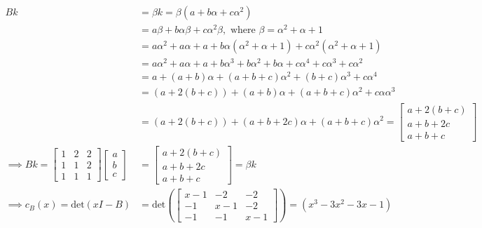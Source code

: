 \begin{align*}
    Bk &= \beta k = \beta(a + b\alpha + c\alpha^2) \\
    &= a\beta + b\alpha\beta + c\alpha^2\beta, \text{ where } \beta = \alpha^2 + \alpha + 1 \\
    &= a\alpha^2 + a\alpha + a + b\alpha(\alpha^2 + \alpha + 1) + c\alpha^2(\alpha^2 + \alpha + 1) \\
    &= a\alpha^2 + a\alpha + a + b\alpha^3 + b\alpha^2 + b\alpha + c\alpha^4 + c\alpha^3 + c\alpha^2 \\
    &= a + (a + b)\alpha + (a + b + c)\alpha^2 + (b + c)\alpha^3 + c\alpha^4 \\
    &= (a + 2(b+c)) + (a + b)\alpha + (a + b + c)\alpha^2 + c\alpha\alpha^3 \\
    &= (a + 2(b+c)) + (a + b + 2c)\alpha + (a + b + c)\alpha^2 = \left[\begin{array}{c}
        a + 2(b+c) \\
        a + b + 2c \\
        a + b + c
    \end{array}\right] \\
    \implies Bk = \left[\begin{array}{ccc}
    1 & 2 & 2  \\
    1 & 1 & 2 \\
    1 & 1 & 1
\end{array}\right]\left[ \begin{array}{c}
    a  \\
    b \\
    c
\end{array}\right] &= \left[\begin{array}{c}
        a + 2(b+c) \\
        a + b + 2c \\
        a + b + c
    \end{array}\right] = \beta k \\
    \implies c_B(x) = \text{det}(xI - B) &= \text{det}\left(\left[\begin{array}{ccc}
    x-1 & -2 & -2  \\
    -1 & x-1 & -2 \\
    -1 & -1 & x-1
\end{array}\right]\right) = (x^3 - 3x^2 - 3x - 1)
\end{align*}